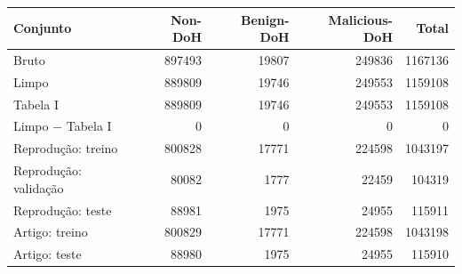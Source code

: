 \begin{tabular}{lrrrr}
\hline
\textbf{Conjunto} & \textbf{Non-DoH} & \textbf{Benign-DoH} & \textbf{Malicious-DoH} & \textbf{Total} \\ \hline
Bruto & 897493 & 19807 & 249836 & 1167136 \\
Limpo & 889809 & 19746 & 249553 & 1159108 \\
Tabela I & 889809 & 19746 & 249553 & 1159108 \\
Limpo $-$ Tabela I & 0 & 0 & 0 & 0 \\
\hline
Reprodução: treino & 800828 & 17771 & 224598 & 1043197 \\
Reprodução: validação & 80082 & 1777 & 22459 & 104319 \\
Reprodução: teste & 88981 & 1975 & 24955 & 115911 \\
\hline
Artigo: treino & 800829 & 17771 & 224598 & 1043198 \\
Artigo: teste & 88980 & 1975 & 24955 & 115910 \\
\hline
\end{tabular}
